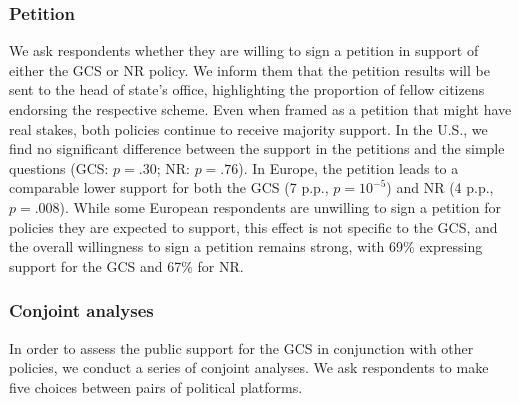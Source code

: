 \subsubsection{Petition}\label{subsubsec:petition} %

We ask respondents whether they are willing to sign a petition in support of either the GCS or NR policy. We inform them that the petition results will be sent to the head of state's office, highlighting the proportion of fellow citizens endorsing the respective scheme. Even when framed as a petition that might have real stakes, both policies continue to receive majority support. In the U.S., we find no significant difference between the support in the %
petitions and the simple questions (GCS: $p=.30$; NR: $p=.76$). %
In Europe, the petition leads to a comparable lower support for both the GCS (7 p.p., $p=10^{-5}$) and NR (4 p.p., $p = .008$). While some European respondents are unwilling to sign a petition for policies they are expected to support, this effect is not specific to the GCS, and the overall willingness to sign a %
petition remains strong, with 69\% expressing support for the GCS and 67\% for NR.

\subsubsection{Conjoint analyses}\label{subsubsec:conjoint} %

In order to assess the public support for the GCS in conjunction with other policies, we conduct a series of conjoint analyses. We ask respondents to make five choices between pairs of political platforms.

